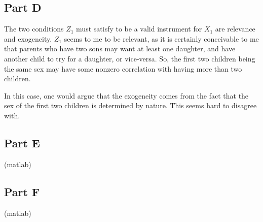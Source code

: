 \documentclass[11pt]{article} %
\begin{document}
\subsection{Part D}

The two conditions $Z_1$ must satisfy to be a valid instrument for $X_1$ are relevance and exogeneity. $Z_1$ seems to me to be relevant, as it is certainly conceivable to me that parents who have two sons may want at least one daughter, and have another child to try for a daughter, or vice-versa. So, the first two children being the same sex may have some nonzero correlation with having more than two children.

In this case, one would argue that the exogeneity comes from the fact that the sex of the first two children is determined by nature. This seems hard to disagree with.
\subsection{Part E}
(matlab)
\subsection{Part F}
(matlab)
\end{document}
